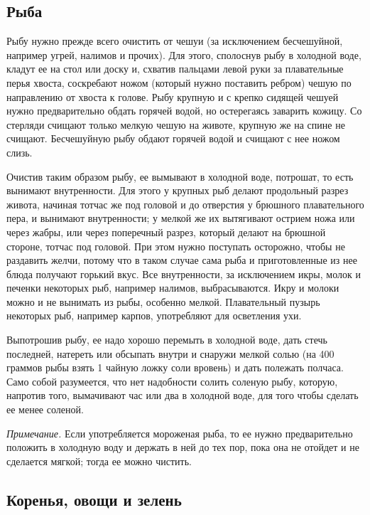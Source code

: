 \subsection{Рыба}

Рыбу нужно прежде всего очистить от чешуи (за исключением бесчешуйной, например угрей, налимов и прочих). Для этого, сполоснув рыбу в холодной воде, кладут ее на стол или доску и, схватив пальцами левой руки за плавательные перья хвоста, соскребают ножом (который нужно поставить ребром) чешую по направлению от хвоста к голове. Рыбу крупную и с крепко сидящей чешуей нужно предварительно обдать горячей водой, но остерегаясь заварить кожицу. Со стерляди счищают только мелкую чешую на животе, крупную же на спине не счищают. Бесчешуйную рыбу обдают горячей водой и счищают с нее ножом слизь.

Очистив таким образом рыбу, ее вымывают в холодной воде, потрошат, то есть вынимают внутренности. Для этого у крупных рыб делают продольный разрез живота, начиная тотчас же под головой и до отверстия у брюшного плавательного пера, и вынимают внутренности; у мелкой же их вытягивают острием ножа или через жабры, или через поперечный разрез, который делают на брюшной стороне, тотчас под головой. При этом нужно поступать осторожно, чтобы не раздавить желчи, потому что в таком случае сама рыба и приготовленные из нее блюда получают горький вкус. Все внутренности, за исключением икры, молок и печенки некоторых рыб, например налимов, выбрасываются. Икру и молоки можно и не вынимать из рыбы, особенно мелкой. Плавательный пузырь некоторых рыб, например карпов, употребляют для осветления ухи.

Выпотрошив рыбу, ее надо хорошо перемыть в холодной воде, дать стечь последней, натереть или обсыпать внутри и снаружи мелкой солью (на 400 граммов рыбы взять 1 чайную ложку соли вровень) и дать полежать полчаса. Само собой разумеется, что нет надобности солить соленую рыбу, которую, напротив того, вымачивают час или два в холодной воде, для того чтобы сделать ее менее соленой.

 \emph{Примечание.} Если употребляется мороженая рыба, то ее нужно предварительно положить в холодную воду и держать в ней до тех пор, пока она не отойдет и не сделается мягкой; тогда ее можно чистить.

\subsection{Коренья, овощи и зелень}


